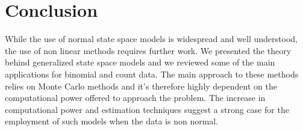 \section{Conclusion}
\justify

While the use of normal state space models is widespread and well understood, the use of non linear methods requires further work. We presented the theory behind generalized state space models and we reviewed some of the main applications for binomial and count data. The main approach to these methods relies on Monte Carlo methods and it's therefore highly dependent on the computational power offered to approach the problem. The increase in computational power and estimation techniques suggest a strong case for the employment of such models when the data is non normal.
